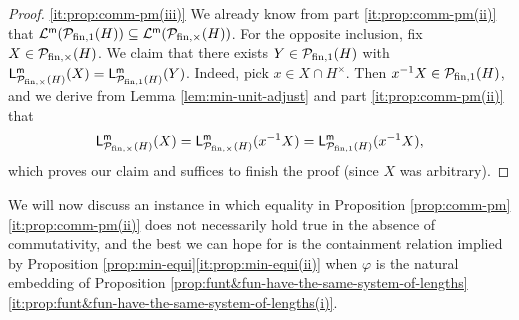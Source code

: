 \begin{proof}
	\ref{it:prop:comm-pm(iii)} We already know from part \ref{it:prop:comm-pm(ii)} that $\mathcal{L}^{\mathsf{m}}(\mathcal P_{\textrm{fin},1}(H)) \subseteq \mathcal{L}^{\mathsf{m}}(\mathcal P_{\textrm{fin}, \times}(H))$. For the opposite inclusion, fix $X \in \mathcal{P}_{\textrm{fin}, \times}(H)$. We claim that there exists $Y \in \mathcal P_{\textrm{fin},1}(H)$ with 
	$\mathsf L_{\mathcal{P}_{\textrm{fin}, \times}(H)}^{\mathsf{m}}(X) = \mathsf L_{\mathcal{P}_{\textrm{fin},1}(H)}^{\mathsf{m}}(Y)$.
Indeed, pick $x \in X \cap H^\times$. Then $x^{-1} X\in \mathcal{P}_{\textrm{fin},1}(H)$, and we derive from Lemma \ref{lem:min-unit-adjust} and part \ref{it:prop:comm-pm(ii)} that 
	\[
	\mathsf{L}_{\mathcal{P}_{\textrm{fin}, \times}(H)}^{\mathsf{m}}(X) = \mathsf{L}_{\mathcal{P}_{\textrm{fin}, \times}(H)}^{\mathsf{m}}(x^{-1}X) = \mathsf{L}_{\mathcal{P}_{\textrm{fin},1}(H)}^{\mathsf{m}}(x^{-1} X),
	\]
	which proves our claim and suffices to finish the proof (since $X$ was arbitrary).
\end{proof}
%
We will now discuss an instance in which equality in Proposition \ref{prop:comm-pm}\ref{it:prop:comm-pm(ii)} does not necessarily hold true in the absence of commutativity, and the best we can hope for is the containment relation implied by Proposition \ref{prop:min-equi}\ref{it:prop:min-equi(ii)} when $\varphi$ is the natural embedding of  Proposition \ref{prop:funt&fun-have-the-same-system-of-lengths}\ref{it:prop:funt&fun-have-the-same-system-of-lengths(i)}.
%
